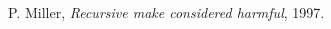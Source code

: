 \renewcommand{\bibname}{References}

\begin{thebibliography}{90}


  P. Miller,
  \emph{Recursive make considered harmful},
  1997.

\end{thebibliography}